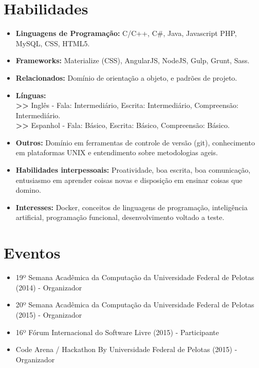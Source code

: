 \documentclass[11pt,a4paper,sans]{moderncv}        %
\begin{document}
\section{Habilidades}

\vspace{6pt}

\begin{itemize}

\item \textbf{Linguagens de Programação:} C/C++, C\#, Java, Javascript PHP, MySQL, CSS, HTML5.
\item \textbf{Frameworks:} Materialize (CSS), AngularJS, NodeJS, Gulp, Grunt, Sass.
\item \textbf{Relacionados:} Domínio de orientação a objeto, e padrões de projeto. 
\item \textbf{Línguas:}
\\\textbf{>>} Inglês - Fala: Intermediário, Escrita: Intermediário, Compreensão: Intermediário. 
\\\textbf{>>} Espanhol - Fala: Básico, Escrita: Básico, Compreensão: Básico.  
\item \textbf{Outros:} Domínio em ferramentas de controle de versão (git), conhecimento em plataformas UNIX e entendimento sobre metodologias ageis.
\item \textbf{Habilidades interpessoais:} Proatividade, boa escrita, boa comunicação, entusiasmo em aprender coisas novas e disposição em ensinar coisas que domino.
\item \textbf{Interesses:} Docker, conceitos de linguagens de programação, inteligência artificial, programação funcional, desenvolvimento voltado a teste. 

\end{itemize}


\section{Eventos}

\vspace{6pt}
 
\begin{itemize}

\item{19º Semana Acadêmica da Computação da Universidade Federal de Pelotas (2014) - Organizador}
\item{20º Semana Acadêmica da Computação da Universidade Federal de Pelotas (2015)  - Organizador}
\item{16º Fórum Internacional do Software Livre (2015) - Participante}
\item{Code Arena / Hackathon By Universidade Federal de Pelotas (2015) - Organizador}
\end{itemize}
\end{document}

